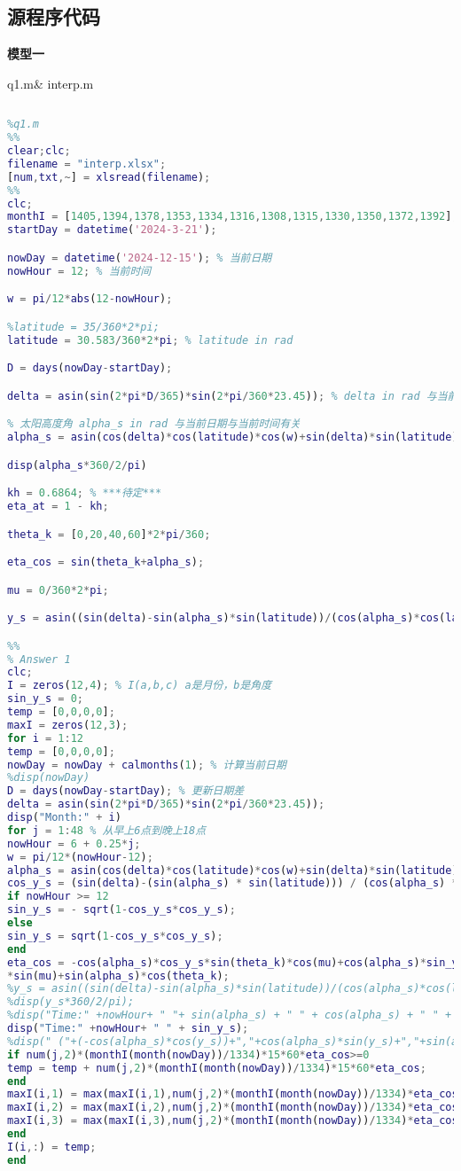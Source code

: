 \documentclass[withoutpreface,bwprint]{cumcmthesis} %
\begin{document}
\begin{appendices}
 \section{源程序代码}
\textbf{模型一}

q1.m\quad \& \quad interp.m
\begin{lstlisting}[language=matlab]
	
%q1.m
%%
clear;clc;
filename = "interp.xlsx";
[num,txt,~] = xlsread(filename);
%%
clc;
monthI = [1405,1394,1378,1353,1334,1316,1308,1315,1330,1350,1372,1392];
startDay = datetime('2024-3-21');

nowDay = datetime('2024-12-15'); % 当前日期
nowHour = 12; % 当前时间

w = pi/12*abs(12-nowHour);

%latitude = 35/360*2*pi;
latitude = 30.583/360*2*pi; % latitude in rad

D = days(nowDay-startDay);

delta = asin(sin(2*pi*D/365)*sin(2*pi/360*23.45)); % delta in rad 与当前日期有关

% 太阳高度角 alpha_s in rad 与当前日期与当前时间有关
alpha_s = asin(cos(delta)*cos(latitude)*cos(w)+sin(delta)*sin(latitude)); 

disp(alpha_s*360/2/pi)

kh = 0.6864; % ***待定***
eta_at = 1 - kh; 

theta_k = [0,20,40,60]*2*pi/360;

eta_cos = sin(theta_k+alpha_s);

mu = 0/360*2*pi;

y_s = asin((sin(delta)-sin(alpha_s)*sin(latitude))/(cos(alpha_s)*cos(latitude)));

%%
% Answer 1
clc;
I = zeros(12,4); % I(a,b,c) a是月份，b是角度
sin_y_s = 0;
temp = [0,0,0,0];
maxI = zeros(12,3);
for i = 1:12
temp = [0,0,0,0];
nowDay = nowDay + calmonths(1); % 计算当前日期
%disp(nowDay)
D = days(nowDay-startDay); % 更新日期差
delta = asin(sin(2*pi*D/365)*sin(2*pi/360*23.45));
disp("Month:" + i)
for j = 1:48 % 从早上6点到晚上18点
nowHour = 6 + 0.25*j;
w = pi/12*(nowHour-12);
alpha_s = asin(cos(delta)*cos(latitude)*cos(w)+sin(delta)*sin(latitude));
cos_y_s = (sin(delta)-(sin(alpha_s) * sin(latitude))) / (cos(alpha_s) * cos(latitude));
if nowHour >= 12
sin_y_s = - sqrt(1-cos_y_s*cos_y_s);
else 
sin_y_s = sqrt(1-cos_y_s*cos_y_s);
end
eta_cos = -cos(alpha_s)*cos_y_s*sin(theta_k)*cos(mu)+cos(alpha_s)*sin_y_s*sin(theta_k)
*sin(mu)+sin(alpha_s)*cos(theta_k);
%y_s = asin((sin(delta)-sin(alpha_s)*sin(latitude))/(cos(alpha_s)*cos(latitude)));
%disp(y_s*360/2/pi);
%disp("Time:" +nowHour+ " "+ sin(alpha_s) + " " + cos(alpha_s) + " " + sin(y_s) + " " + cos(y_s))
disp("Time:" +nowHour+ " " + sin_y_s);
%disp(" ("+(-cos(alpha_s)*cos(y_s))+","+cos(alpha_s)*sin(y_s)+","+sin(alpha_s)+")")
if num(j,2)*(monthI(month(nowDay))/1334)*15*60*eta_cos>=0
temp = temp + num(j,2)*(monthI(month(nowDay))/1334)*15*60*eta_cos;
end
maxI(i,1) = max(maxI(i,1),num(j,2)*(monthI(month(nowDay))/1334)*eta_cos(2));
maxI(i,2) = max(maxI(i,2),num(j,2)*(monthI(month(nowDay))/1334)*eta_cos(3));
maxI(i,3) = max(maxI(i,3),num(j,2)*(monthI(month(nowDay))/1334)*eta_cos(4));
end
I(i,:) = temp;
end


\end{lstlisting}
\end{appendices}
\end{document}
